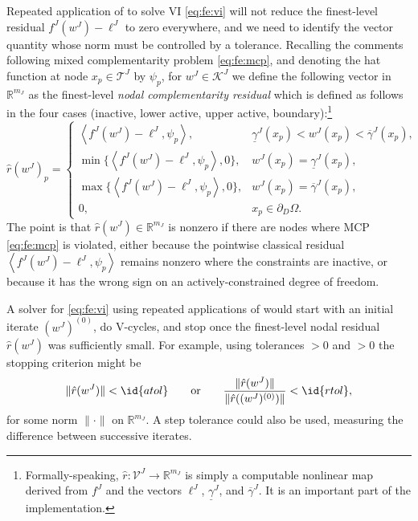 \documentclass[letterpaper,final,12pt,reqno]{amsart}
\theoremstyle{cstyle}
\theoremstyle{cstyle*}
\theoremstyle{dstyle}
\numberwithin{equation}{section}
\numberwithin{figure}{section}
\numberwithin{table}{section}
\numberwithin{theorem}{section}
\newcommand{\RR}{\mathbb{R}}
\newcommand{\ip}[2]{\left<#1,#2\right>}
\begin{document}
Repeated application of  to solve VI \eqref{eq:fe:vi} will not reduce the finest-level residual $f^J(w^J) - \ell^J$ to zero everywhere, and we need to identify the vector quantity whose norm must be controlled by a tolerance.  Recalling the comments following mixed complementarity problem \eqref{eq:fe:mcp}, and denoting the hat function at node $x_p \in \mathcal{T}^J$ by $\psi_p$, for $w^J \in \mathcal{K}^J$ we define the following vector in $\RR^{m_J}$ as the finest-level \emph{nodal complementarity residual} which is defined as follows in the four cases (inactive, lower active, upper active, boundary):\footnote{Formally-speaking, $\hat r:\mathcal{V}^J \to \RR^{m_J}$ is simply a computable nonlinear map derived from $f^J$ and the vectors $\ell^J$, $\underline{\gamma}^J$, and $\overline{\gamma}^J$.  It is an important part of the implementation.}
\begin{equation}
\hat r(w^J)_p = \begin{cases}
    \ip{f^J(w^J)-\ell^J}{\psi_p}, & \underline{\gamma}^J(x_p) < w^J(x_p) < \overline{\gamma}^J(x_p), \\
    \min\{\ip{f^J(w^J)-\ell^J}{\psi_p},0\}, & w^J(x_p) = \underline{\gamma}^J(x_p), \\
    \max\{\ip{f^J(w^J)-\ell^J}{\psi_p},0\}, & w^J(x_p) = \overline{\gamma}^J(x_p), \\
    0, & x_p \in \partial_D\Omega. \end{cases} \label{eq:cpresidual}
\end{equation}
The point is that $\hat r(w^J)\in \RR^{m_J}$ is nonzero if there are nodes where MCP \eqref{eq:fe:mcp} is violated, either because the pointwise classical residual $\ip{f^J(w^J)-\ell^J}{\psi_p}$ remains nonzero where the constraints are inactive, or because it has the wrong sign on an actively-constrained degree of freedom.

A solver for \eqref{eq:fe:vi} using repeated applications of  would start with an initial iterate $(w^J)^{(0)}$, do V-cycles, and stop once the finest-level nodal residual $\hat r(w^J)$ was sufficiently small.  For example, using tolerances $>0$ and $>0$ the stopping criterion might be
\begin{equation}
\|\hat r(w^J)\| < \id{atol} \qquad \text{or} \qquad \frac{\|\hat r(w^J)\|}{\|\hat r((w^J)^{(0)})\|} < \id{rtol},
\end{equation}
for some norm $\|\cdot\|$ on $\RR^{m_J}$.  A step tolerance could also be used, measuring the difference between successive iterates.
\end{document}
